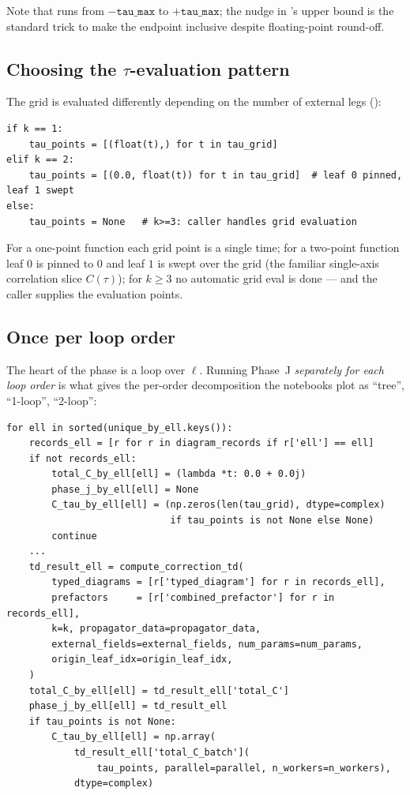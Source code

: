 Note that  runs from $-\texttt{tau\_max}$ to $+\texttt{tau\_max}$;
the  nudge in 's upper bound is the standard
trick to make the endpoint inclusive despite floating-point round-off.

\subsection{Choosing the \texorpdfstring{$\tau$}{tau}-evaluation pattern}

The grid is evaluated differently depending on the number of external legs
():

\begin{lstlisting}
if k == 1:
    tau_points = [(float(t),) for t in tau_grid]
elif k == 2:
    tau_points = [(0.0, float(t)) for t in tau_grid]  # leaf 0 pinned, leaf 1 swept
else:
    tau_points = None   # k>=3: caller handles grid evaluation
\end{lstlisting}

For a one-point function each grid point is a single time; for a two-point
function leaf $0$ is pinned to $0$ and leaf $1$ is swept over the grid (the
familiar single-axis correlation slice $C(\tau)$); for $k\ge3$ no automatic grid
eval is done ---  and the caller supplies the evaluation
points.

\subsection{Once per loop order}

The heart of the phase is a loop over $\ell$. Running Phase~J \emph{separately for
each loop order} is what gives the per-order decomposition the notebooks plot as
``tree'', ``1-loop'', ``2-loop'':

\begin{lstlisting}
for ell in sorted(unique_by_ell.keys()):
    records_ell = [r for r in diagram_records if r['ell'] == ell]
    if not records_ell:
        total_C_by_ell[ell] = (lambda *t: 0.0 + 0.0j)
        phase_j_by_ell[ell] = None
        C_tau_by_ell[ell] = (np.zeros(len(tau_grid), dtype=complex)
                             if tau_points is not None else None)
        continue
    ...
    td_result_ell = compute_correction_td(
        typed_diagrams = [r['typed_diagram'] for r in records_ell],
        prefactors     = [r['combined_prefactor'] for r in records_ell],
        k=k, propagator_data=propagator_data,
        external_fields=external_fields, num_params=num_params,
        origin_leaf_idx=origin_leaf_idx,
    )
    total_C_by_ell[ell] = td_result_ell['total_C']
    phase_j_by_ell[ell] = td_result_ell
    if tau_points is not None:
        C_tau_by_ell[ell] = np.array(
            td_result_ell['total_C_batch'](
                tau_points, parallel=parallel, n_workers=n_workers),
            dtype=complex)
\end{lstlisting}

